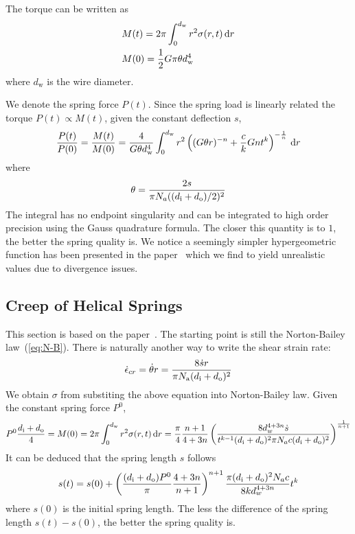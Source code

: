 \documentclass[10pt]{article}
\begin{document}
The torque can be written as
\begin{align*}
&M(t) = 2\pi \int_0^{d_{\text{w}}} r^2 \sigma(r,t)\,\mathrm{d} r\\
&M(0)={1\over 2} G\pi\theta d_{\text{w}}^4
\end{align*}
where $d_{\text{w}}$ is the wire diameter.

We denote the spring force $P(t)$. Since the spring load is linearly related the torque $P(t)\propto M(t)$, given the constant deflection $s$,
\[
{P(t)\over P(0)} = {M(t)\over M(0)} = {4\over G\theta d_{\text{w}}^4}\int_0^{d_{\text{w}}} r^2 \left( (G\theta r)^{-n} + {c\over k} Gnt^k \right)^{-{1\over n}} \,\mathrm{d} r
\]
where
\[
\theta = {2s\over \pi N_a ((d_{\text{i}}+d_{\text{o}})/2)^2}
\]
The integral has no endpoint singularity and can be integrated to high order precision using the Gauss quadrature formula. The closer this quantity is to $1$, the better the spring quality is. We notice a seemingly simpler hypergeometric function has been presented in the paper~\cite{Relaxation3} which we find to yield unrealistic values due to divergence issues.


\subsection{Creep of Helical Springs}
This section is based on the paper~\cite{Relaxation3}. The starting point is still the Norton-Bailey law~(\ref{eq:N-B}). There is naturally another way to write the shear strain rate:
\[
\dot{\epsilon}_{cr} = \dot{\theta} r = {8\dot{s} r\over \pi N_{\text{a}} (d_{\text{i}}+d_{\text{o}})^2}
\]
We obtain $\sigma$ from substiting the above equation into Norton-Bailey law. Given the constant spring force $P^0$,
\[
P^0{d_{\text{i}}+d_{\text{o}}\over 4}=M(0)=2\pi\int_0^{d_{\text{w}}} r^2 \sigma(r,t)\,\mathrm{d} r
={\pi\over 4}{n+1\over 4+3n}\left( {8d_w^{4+3n}\dot{s} \over t^{k-1} (d_{\text{i}}+d_{\text{o}})^2 \pi N_a c (d_{\text{i}}+d_{\text{o}})^2} \right)^{{1\over n+1}}
\]
It can be deduced that the spring length $s$ follows
\[
s(t) = s(0) + \left( {(d_{\text{i}}+d_{\text{o}})P^0\over \pi}{4+3n\over n+1} \right)^{n+1} {\pi (d_{\text{i}}+d_{\text{o}})^2 N_a c\over 8kd_w^{4+3n}} t^k
\]
where $s(0)$ is the initial spring length. The less the difference of the spring length $s(t)-s(0)$, the better the spring quality is.
 
\vfill\pagebreak




\end{document}
